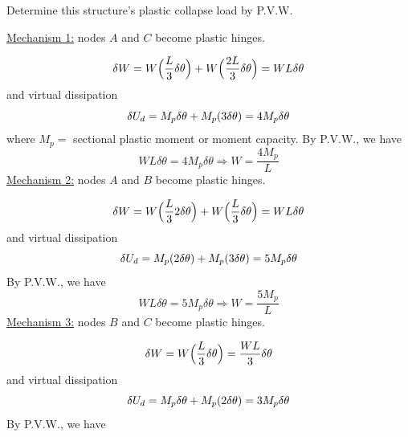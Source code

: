 \begin{example}
Determine this structure's plastic collapse load by P.V.W.
\begin{fig}
  
\end{fig}
\underline{Mechanism 1:} nodes $A$ and $C$ become plastic hinges.
\begin{fig}
  
\end{fig}
\begin{equation*}
  \delta W = W\Bigl(\frac L3\delta\theta\Bigr) + W\Bigl(\frac{2L}{3}\delta\theta\Bigr) = WL\delta\theta
\end{equation*}
and virtual dissipation
\begin{equation*}
  \delta U_d = M_p\delta\theta + M_p(3\delta\theta) = 4M_p\delta\theta
\end{equation*}
where $M_p =$ sectional plastic moment or moment capacity. By P.V.W., we have
\begin{equation*}
  WL\delta\theta = 4M_p\delta\theta \Rightarrow W = \frac{4M_p}{L}
\end{equation*}
\underline{Mechanism 2:} nodes $A$ and $B$ become plastic hinges.
\begin{fig}
  
\end{fig}
\begin{equation*}
  \delta W = W\Bigl(\frac L3 2\delta\theta\Bigr) + W\Bigl(\frac L3\delta\theta\Bigr) = WL\delta\theta
\end{equation*}
and virtual dissipation
\begin{equation*}
  \delta U_d = M_p(2\delta\theta) + M_p(3\delta\theta) = 5M_p\delta\theta
\end{equation*}
By P.V.W., we have
\begin{equation*}
  WL\delta\theta = 5M_p\delta\theta \Rightarrow W = \frac{5M_p}{L}
\end{equation*}
\underline{Mechanism 3:} nodes $B$ and $C$ become plastic hinges.
\begin{fig}
  
\end{fig}
\begin{equation*}
  \delta W = W\Bigl(\frac L3\delta\theta\Bigr) = \frac{WL}{3}\delta\theta
\end{equation*}
and virtual dissipation
\begin{equation*}
  \delta U_d = M_p\delta\theta + M_p(2\delta\theta) = 3M_p\delta\theta
\end{equation*}
By P.V.W., we have

\end{example}

